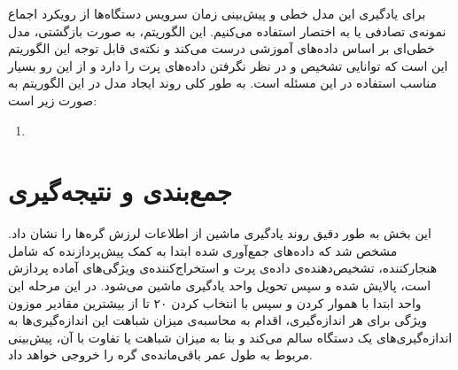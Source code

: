 برای یادگیری این مدل خطی و پیش‌بینی زمان سرویس دستگاه‌ها از رویکرد اجماع نمونه‌ی تصادفی یا به اختصار  استفاده می‌کنیم. این الگوریتم، به صورت بازگشتی، مدل خطی‌ای بر اساس داده‌های آموزشی درست می‌کند و نکته‌ی قابل توجه این الگوریتم این است که توانایی تشخیص و در نظر نگرفتن داده‌های پرت را دارد و از این رو بسیار مناسب استفاده در این مسئله است. به طور کلی روند ایجاد مدل در این الگوریتم به صورت زیر است\cite{derpanis2010overview}:

\begin{enumerate}

\item

\end{enumerate}

\section{جمع‌بندی و نتیجه‌گیری}
این بخش به طور دقیق روند یادگیری ماشین از اطلاعات لرزش گره‌ها را نشان داد. مشخص شد که داده‌های جمع‌آوری شده ابتدا به کمک پیش‌پردازنده که شامل هنجارکننده، تشخیص‌دهنده‌ی داده‌ی پرت و استخراج‌کننده‌ی ویژگی‌های آماده پردازش است، پالایش شده و سپس تحویل واحد یادگیری ماشین می‌شود. در این مرحله این واحد ابتدا با هموار کردن و سپس با انتخاب کردن ۲۰ تا از بیشترین مقادیر موزون ویژگی  برای هر اندازه‌گیری، اقدام به محاسبه‌ی میزان شباهت این اندازه‌گیری‌ها به اندازه‌گیری‌های یک دستگاه سالم می‌کند و بنا به میزان شباهت یا تفاوت با آن، پیش‌بینی مربوط به طول عمر باقی‌مانده‌ی گره را خروجی خواهد داد.